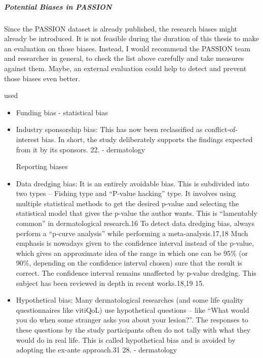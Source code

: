 \documentclass[12pt, a4paper, oneside]{book}   	%
\newif\ifrawcitationactive
\newcommand{\rawcitationstart}{
	\color{purple}\rawcitationactivetrue
}
\newcommand{\rawcitationend}{
	\color{black}\rawcitationactivefalse
}
\newcommand{\rawcitationusedstart}{\color{violet}}
\newcommand{\rawcitationusedend}{%
	\ifrawcitationactive
	\color{purple}  %
	\else
	\color{black}  %
	\fi
}
\begin{document}
			\subparagraph{Potential Biases in PASSION}
			Since the PASSION dataset is already published, the research biases might already be introduced. It is not feasible during the duration of this thesis to make an evaluation on those biases. Instead, I would recommend the PASSION team and researcher in general, to check the list above carefully and take measures against them. Maybe, an external evaluation could help to detect and prevent those biases even better.
			
			
			
			\rawcitationstart
			used
			\begin{itemize}		
				\rawcitationusedstart
				\item Funding bias \autocites{Mester_2022}{Mester_2017} - statistical bias
				\item  Industry sponsorship bias: This has now been reclassified as conflict-of-interest bias. In short, the study deliberately supports the findings expected from it by its sponsors. 22.\autocite{Chakraborty_2024} - dermatology
				
				Reporting biases
				\item  Data dredging bias: It is an entirely avoidable bias. This is subdivided into two types – Fishing type and “P-value hacking” type. It involves using multiple statistical methods to get the desired p-value and selecting the statistical model that gives the p-value the author wants. This is “lamentably common” in dermatological research.16 To detect data dredging bias, always perform a “p-curve analysis” while performing a meta-analysis.17,18 Much emphasis is nowadays given to the confidence interval instead of the p-value, which gives an approximate idea of the range in which one can be 95\% (or 90\%, depending on the confidence interval chosen) sure that the result is correct. The confidence interval remains unaffected by p-value dredging. This subject has been reviewed in depth in recent works.18,19 15.\autocite{Chakraborty_2024}
				
				\item Hypothetical bias: Many dermatological researches (and some life quality questionnaires like vitiQoL) use hypothetical questions – like “What would you do when some stranger asks you about your lesion?”. The responses to these questions by the study participants often do not tally with what they would do in real life. This is called hypothetical bias and is avoided by adopting the ex-ante approach.31 28. \autocite{Chakraborty_2024} - dermatology
				\rawcitationusedend
			\end{itemize}
			\rawcitationend
			
\end{document}
